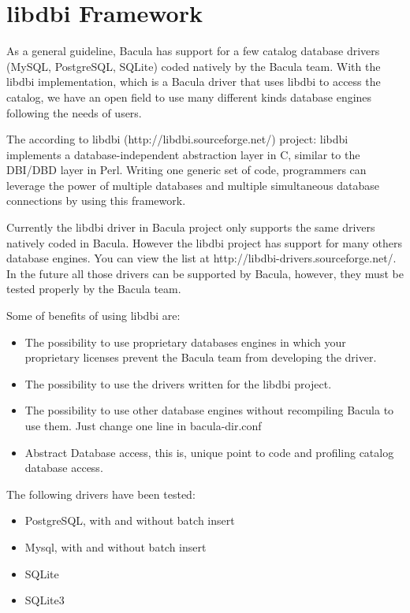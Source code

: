 \section{libdbi Framework}
As a general guideline, Bacula has support for a few catalog database drivers
(MySQL, PostgreSQL, SQLite)
coded natively by the Bacula team.  With the libdbi implementation, which is a
Bacula driver that uses libdbi to access the catalog, we have an open field to
use many different kinds database engines following the needs of users.

The according to libdbi (http://libdbi.sourceforge.net/) project: libdbi
implements a database-independent abstraction layer in C, similar to the
DBI/DBD layer in Perl. Writing one generic set of code, programmers can
leverage the power of multiple databases and multiple simultaneous database
connections by using this framework.

Currently the libdbi driver in Bacula project only supports the same drivers
natively coded in Bacula.  However the libdbi project has support for many
others database engines. You can view the list at
http://libdbi-drivers.sourceforge.net/. In the future all those drivers can be
supported by Bacula, however, they must be tested properly by the Bacula team.

Some of benefits of using libdbi are:
\begin{itemize}
\item The possibility to use proprietary databases engines in which your
  proprietary licenses prevent the Bacula team from developing the driver.
 \item The possibility to use the drivers written for the libdbi project.
 \item The possibility to use other database engines without recompiling Bacula
   to use them.  Just change one line in bacula-dir.conf
 \item Abstract Database access, this is, unique point to code and profiling
   catalog database access.
 \end{itemize}
 
 The following drivers have been tested:
 \begin{itemize}
 \item PostgreSQL, with and without batch insert
 \item Mysql, with and without batch insert
 \item SQLite
 \item SQLite3
 \end{itemize}

